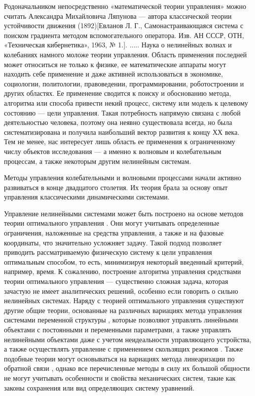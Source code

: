 Родоначальником непосредственно «математической теории управления» можно считать Александра Михайловича Ляпунова — автора классической теории устойчивости движения (1892)[Евланов Л. Г., Самонастраивающаяся система с поиском градиента методом вспомогательного оператора. Изв. АН СССР, ОТН, «Техническая кибернетика», 1963, № 1.].
.....
Наука о нелинейных волнах и колебаниях намного моложе теории управления. Область применения последней может относиться не только к физике, ее математические аппараты могут находить себе применение и даже активней использоваться в экономике, социологии, политологии, правоведении, программировании, роботостроении и других областях. Ее применение сводится к поиску и обоснованию метода, алгоритма или способа привести некий процесс, систему или модель к целевому состоянию --- цели управления. Такая потребность напрямую связана с любой деятельностью человека, поэтому она неявно существовала всегда, но была систематизирована и получила наибольший вектор развития к концу ХХ века. Тем не менее, нас интересует лишь область ее применения к ограниченному числу объектов исследования --- а именно к волновым и колебательным процессам, а также некоторым другим нелинейным системам.

Методы управления колебательными и волновыми процессами начали активно развиваться в конце двадцатого столетия. Их теория брала за основу опыт управления классическими динамическими системами. 

Управление нелинейными системами может быть построено на основе методов теории оптимального управления \cite{intro_alekseev}. Они могут учитывать определенные ограничения, наложенные на средства управления, а также и на фазовые координаты, что значительно усложняет задачу. Такой подход позволяет приводить рассматриваемую физическую систему к цели управления оптимальным способом, то есть, минимизируя некоторый введенный критерий, например, время. К сожалению, построение алгоритма управления средствами теории оптимального управления --- существенно сложная задача, которая зачастую не имеет аналитических решений, особенно если говорить о сильно нелинейных системах.
Наряду с теорией оптимального управления существуют другие общие теории, основанные на различных вариациях метода управления системами переменной структуры \cite{intro_emel}, которые позволяют управлять линейными объектами с постоянными и переменными параметрами, а также управлять нелинейными объектами даже с учетом неидеальности управляющего устройства, а также осуществлять управление с применением скользящих режимов \cite{intro_utkin}. Также подобные теории могут основываться на вариациях метода линеаризации по обратной связи \cite{isidori1995nonlinear}, однако все перечисленные методы в силу их большой общности не могут учитывать особенности и свойства механических систем, такие как законы сохранения или вид определяющих систему уравнений.

